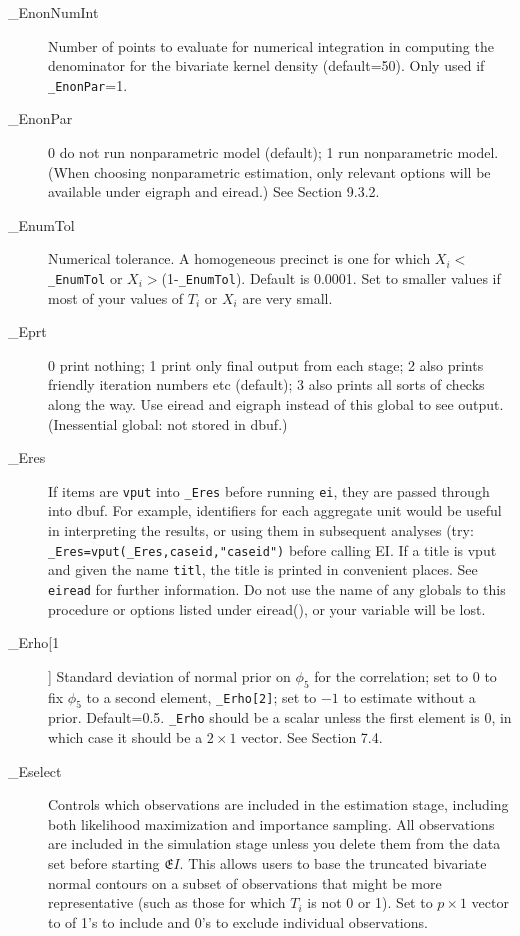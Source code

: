 \documentclass[11pt,titlepage]{article}
\newcommand{\EI}{\ensuremath{{\mathfrak EI}}}
\begin{document}
\begin{description}
\item[\_EnonNumInt] Number of points to evaluate for numerical
  integration in computing the denominator for the bivariate kernel
  density (default=50).  Only used if \texttt{\_EnonPar}=1.

\item[\_EnonPar] 0 do not run nonparametric model (default); 1 run
  nonparametric model.  (When choosing nonparametric estimation, only
  relevant options will be available under eigraph and eiread.)  See
  Section 9.3.2.

\item[\_EnumTol] Numerical tolerance.  A homogeneous precinct is one
  for which $X_i<$\texttt{\_EnumTol} or $X_i>$(1-\texttt{\_EnumTol}).
  Default is 0.0001.  Set to smaller values if most of your values of
  $T_i$ or $X_i$ are very small.

\item[\_Eprt] 0 print nothing; 1 print only final output from each
  stage; 2 also prints friendly iteration numbers etc (default); 3
  also prints all sorts of checks along the way.  Use eiread and
  eigraph instead of this global to see output.  (Inessential global:
  not stored in dbuf.)

\item[\_Eres] If items are \texttt{vput} into \texttt{\_Eres} before
  running \texttt{ei}, they are passed through into dbuf.  For
  example, identifiers for each aggregate unit would be useful in
  interpreting the results, or using them in subsequent analyses (try:
  \texttt{\_Eres=vput(\_Eres,caseid,"caseid")} before calling EI.  If
  a title is vput and given the name \texttt{titl}, the title is
  printed in convenient places.  See \texttt{eiread} for further
  information.  Do not use the name of any globals to this procedure
  or options listed under eiread(), or your variable will be lost.

\item[\_Erho[1]] Standard deviation of normal prior on $\phi_5$ for
  the correlation; set to 0 to fix $\phi_5$ to a second element,
  \texttt{\_Erho[2]}; set to $-1$ to estimate without a prior.
  Default=0.5.  \texttt{\_Erho} should be a scalar unless the first
  element is 0, in which case it should be a $2\times 1$ vector.  See
  Section 7.4.

\item[\_Eselect] Controls which observations are included in the
  estimation stage, including both likelihood maximization and
  importance sampling. All observations are included in the simulation
  stage unless you delete them from the data set before starting \EI.
  This allows users to base the truncated bivariate normal contours on
  a subset of observations that might be more representative (such as
  those for which $T_i$ is not 0 or 1).  Set to $p\times 1$ vector to
  of 1's to include and 0's to exclude individual observations.


\end{description}
\end{document}
